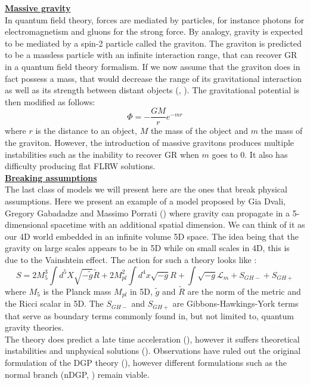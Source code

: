\noindent \textbf{\underline{Massive gravity}} \\
In quantum field theory, forces are mediated by particles, for instance photons for electromagnetism and gluons for the strong force. 
By analogy, gravity is expected to be mediated by a spin-2 particle called the graviton. The graviton is predicted to be a massless 
particle with an infinite interaction range, that can recover GR in a quantum field theory formalism. If we now assume that the graviton does in fact possess a mass, that would 
decrease the range of its gravitational interaction as well as its strength between distant objects (\cite{Fierz_1939}, \cite{deRham_2011}). The gravitational potential is then modified as follows:
\begin{equation}
    \Phi = - \frac{GM}{r}e^{-mr}
\end{equation}
where $r$ is the distance to an object, $M$ the mass of the object and $m$ the mass of the graviton. However, the introduction of massive gravitons produces multiple 
instabilities such as the inability to recover GR when $m$ goes to 0. It also has difficulty producing flat FLRW solutions.\\

\noindent \textbf{\underline{Breaking assumptions}} \\

The last class of models we will present here are the ones that break physical assumptions. Here we present an example of a model proposed by Gia Dvali, Gregory Gabadadze 
and Massimo Porrati (\cite{Dvali_2000}) where gravity can propagate in a 5-dimensional spacetime with an additional spatial dimension. We can think of it as our 4D world embedded 
in an infinite volume 5D space. The idea being that the gravity on large scales appears to be in 5D while on small scales in 4D, this is due to the Vainshtein effect. 
The action for such a theory looks like :
\begin{equation}
    S = 2M_5^3 \int d^5X \sqrt{-\tilde{g}}\tilde{R} + 2M_{pl}^2 \int d^4x \sqrt{-g}R + \int \sqrt{-g}\mathcal{L}_m + S_{GH-} + S_{GH+}
\end{equation}
where $M_5$ is the Planck mass $M_{pl}$ in 5D, $\tilde{g}$ and $\tilde{R}$ are the norm of the metric and the Ricci scalar in 5D. The $S_{GH-}$ and $S_{GH+}$ are Gibbons-Hawkings-York 
terms that serve as boundary terms commonly found in, but not limited to, quantum gravity theories.\\ 
The theory does predict a late time acceleration (\cite{Deffayet_2001}), however it suffers theoretical instabilities and unphysical solutions (\cite{Koyama_2007}). 
Observations have ruled out the original formulation of the DGP theory (\cite{Fang_2008}), however different formulations such as the normal branch (nDGP,  \cite{Lue_2006}) remain viable. 
\\

